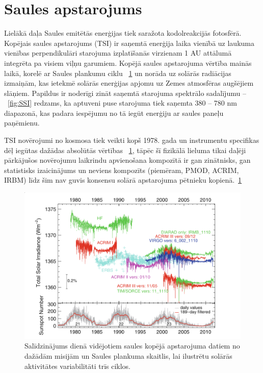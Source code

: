 \section{Saules apstarojums}

Lielākā daļa Saules emitētās enerģijas tiek saražota kodolreakcijās fotosfērā. Kopējais saules apstarojums (TSI) ir saņemtā enerģija laika vienībā uz laukuma vienības perpendikulāri starojuma izplatīšanās virzienam 1 AU attālumā integrēta pa visiem viļņu garumiem.\cite{ThermalProcesses} Kopējā saules apstarojuma vērtība mainās laikā, korelē ar Saules plankumu ciklu ~\ref{fig:TSI_misijas}  un norāda uz solārās radiācijas izmaiņām, kas ietekmē solārās enerģijas apjomu uz Zemes atmosfēras augšējiem slāņiem. Papildus ir noderīgi zināt saņemtā starojuma spektrālo sadalījumu -- ~\ref{fig:SSI} redzams, ka aptuveni puse starojuma tiek saņemta 380 -- 780 nm diapazonā, kas padara iespējumu no tā iegūt enerģiju ar saules paneļu paņēmienu.

TSI novērojumi no kosmosa tiek veikti kopš 1978. gada un instrumentu specifikas dēļ iegūtas dažādas absolūtās vērtības ~\ref{fig:TSI_misijas}, tāpēc šī fizikālā lieluma tikai daļēji pārkājušos novērojumu laikrindu apvienošana kompozītā ir gan zinātnisks, gan statistisks izaicinājums un neviens kompozīts (piemēram, PMOD, ACRIM, IRBM) līdz šim nav guvis konsensu solārā apstarojuma pētnieku kopienā.~\ref{fig:TSI_misijas} 

\begin{figure}[h]
    \centering
    \includegraphics[width=0.6\linewidth]{figures/misc/TSI_misijas.png}
    \caption{Salīdzinājums dienā vidējotiem saules kopējā apstarojuma datiem no dažādām misijām un Saules plankuma skaitlis, lai ilustrētu solārās aktivitātes variabilitāti trīs ciklos. \cite{Frohlich2012}}
    \label{fig:TSI_misijas}
\end{figure}

